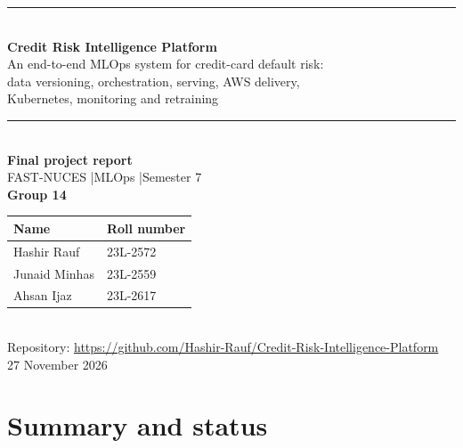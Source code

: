 \documentclass[11pt,a4paper]{article}
\newcommand{\hdr}[1]{\textbf{\color{navy}#1}}
\begin{document}
\begin{titlepage}
\thispagestyle{empty}
\begin{center}
\vspace*{1.2cm}
{\color{blue}\rule{\linewidth}{2pt}}\\[1.2cm]
{\Huge\bfseries\color{navy} Credit Risk Intelligence Platform}\\[0.5cm]
{\Large An end-to-end MLOps system for credit-card default risk:\\ data versioning, orchestration, serving, AWS delivery,\\ Kubernetes, monitoring and retraining}\\[1.4cm]
{\color{blue}\rule{0.5\linewidth}{1pt}}\\[1.0cm]
{\large\bfseries Final project report}\\[0.3cm]
FAST-NUCES \quad|\quad MLOps \quad|\quad Semester 7\\[1.6cm]
{\large\bfseries Group 14}\\[0.3cm]
\begin{tabular}{ll}
\toprule
\hdr{Name} & \hdr{Roll number}\\
\midrule
Hashir Rauf & 23L-2572\\
Junaid Minhas & 23L-2559\\
Ahsan Ijaz & 23L-2617\\
\bottomrule
\end{tabular}\\[1.2cm]
{\normalsize Repository: \url{https://github.com/Hashir-Rauf/Credit-Risk-Intelligence-Platform}}\\[0.3cm]
{\normalsize 27 November 2026}\\[1.5cm]
\end{center}
\end{titlepage}

\tableofcontents
\clearpage

\section{Summary and status}
\label{sec:summary}
\end{document}
